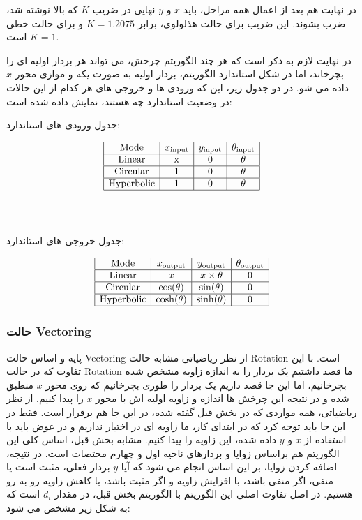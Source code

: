 \documentclass[12pt,titlepage,a4page , tikz , multi,table , svgnames,xcdraw]{article}
\begin{document}
در نهایت هم بعد از اعمال همه مراحل، باید $x$ و $y$ نهایی در ضریب $K$ که بالا نوشته شد، ضرب بشوند. این ضریب برای حالت هذلولوی، برابر $K = 1.2075$ و برای حالت خطی $K=1$ است.

در نهایت لازم به ذکر است که هر چند الگوریتم چرخش، می تواند هر بردار اولیه ای را بچرخاند، اما در شکل استاندارد الگوریتم، بردار اولیه به صورت یکه و موازی محور $x$ داده می شو. در دو جدول زیر، این که ورودی ها و خروجی های هر کدام از این حالات در وضعیت استاندارد چه هستند، نمایش داده شده است:

\begin{center}
جدول ورودی های استاندارد:
\end{center}
$$\begin{array}{|c|c|c|c|}
\hline \text { Mode } & x_{\text {input}} & y_{\text {input}} & \theta_{\text {input}} \\
\hline \text {Linear} & \mathrm{x} & 0 & \mathrm{\theta} \\
\hline \text {Circular} & 1 & 0 & \mathrm{\theta} \\
\hline \text {Hyperbolic} & 1 & 0 & \mathrm{\theta} \\
\hline
\end{array}$$
\\
\\
\begin{center}
جدول خروجی های استاندارد:
\end{center}
$$\begin{array}{|c|c|c|c|}
\hline \text { Mode } & x_{\text {output}} & y_{\text {output}} & \theta_{\text {output}} \\
\hline \text {Linear} & x & x \times \theta & 0 \\
\hline \text {Circular} & \cos (\theta) & \sin (\theta) & 0 \\
\hline \text {Hyperbolic} & \cosh (\theta) & \sinh (\theta) & 0 \\
\hline
\end{array}$$

\subsubsection{حالت Vectoring}

پایه و اساس حالت Vectoring از نظر ریاضیاتی مشابه حالت Rotation است. با این تفاوت که در حالت Rotation ما قصد داشتیم یک بردار را به اندازه زاویه مشخص شده بچرخانیم، اما این جا قصد داریم یک بردار را طوری بچرخانیم که روی محور $x$ منطبق شده و در نتیجه این چرخش ها اندازه و زاویه اولیه اش با محور $x$ را پیدا کنیم. از نظر ریاضیاتی، همه مواردی که در بخش قبل گفته شده، در این جا هم برقرار است. فقط در این جا باید توجه کرد که در ابتدای کار، ما زاویه ای در اختیار نداریم و در عوض باید با استفاده از $x$ و $y$ داده شده، این زاویه را پیدا کنیم. مشابه بخش قبل، اساس کلی این الگوریتم هم براساس زوایا و بردارهای ناحیه اول و چهارم مختصات است. در نتیجه، اضافه کردن زوایا، بر این اساس انجام می شود که آیا $y$ بردار فعلی، مثبت است یا منفی، اگر منفی باشد، با افزایش زاویه و اگر مثبت باشد، با کاهش زاویه رو به رو هستیم. در اصل تفاوت اصلی این الگوریتم با الگوریتم بخش قبل، در مقدار $d_i$ است که به شکل زیر مشخص می شود:
\end{document}
